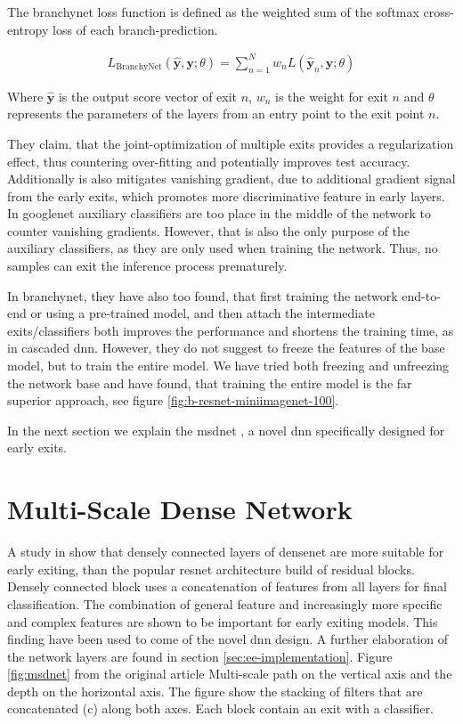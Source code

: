 The \gls{branchynet} loss function is defined as the weighted sum of the softmax cross-entropy loss of each branch-prediction. 

\begin{align}
	L_{\mathrm{BranchyNet}}(\hat{\mathbf{y}},\mathbf{y};\theta) = \sum_{n=1}^{N} w_n L \left(\hat{\mathbf{y}}_{n},\mathbf{y};\theta\right)
\end{align}

Where $ \bm{\hat{y}} $ is the output score vector of exit $ n $, $ w_n $ is the weight for exit $ n $ and $ \theta $ represents the parameters of the layers from an entry point to the exit point $ n $.

They claim, that the joint-optimization of multiple exits provides a regularization effect, thus countering over-fitting and potentially improves test accuracy. Additionally is also mitigates vanishing gradient, due to additional gradient signal from the early exits, which promotes more discriminative feature in early layers. In \gls{googlenet} \cite{szegedy_going_2015} auxiliary classifiers are too place in the middle of the network to counter vanishing gradients. However, that is also the only purpose of the auxiliary classifiers, as they are only used when training the network. Thus, no samples can exit the inference process prematurely. 

In \gls{branchynet}, they have also too found, that first training the network end-to-end or using a pre-trained model, and then attach the intermediate exits/classifiers both improves the performance and shortens the training time, as in cascaded \gls{dnn}. However, they do not suggest to freeze the features of the base model, but to train the entire model. We have tried both freezing and unfreezing the network base and have found, that training the entire model is the far superior approach, see figure \ref{fig:b-resnet-miniimagenet-100}. 

In the next section we explain the \gls{msdnet} \cite{huang_multi-scale_2017}, a novel \gls{dnn} specifically designed for early exits.

\section{Multi-Scale Dense Network}

A study in \cite{huang_densely_2016} show that densely connected layers of \gls{densenet} are more suitable for early exiting, than the popular \gls{resnet} architecture build of residual blocks. Densely connected block uses a concatenation of features from all layers for final classification. The combination of  general feature and increasingly more specific and complex features are shown to be important for early exiting models. This finding have been used to come of the novel \gls{dnn} design. A further elaboration of the network layers are found in section \ref{sec:ee-implementation}. Figure \ref{fig:msdnet} from the original article Multi-scale path on the vertical axis and the depth on the horizontal axis. The figure show the stacking of filters that are concatenated (c) along both axes. Each block contain an exit with a classifier.

